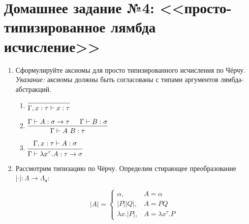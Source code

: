 

\cfoot{}



\section*{Домашнее задание №4: <<просто-типизированное лямбда исчисление>>}
\begin{enumerate}
      \item Сформулируйте аксиомы для просто типизированного исчисления по Чёрчу.
            \emph{Указание:} аксиомы должны быть согласованы с типами аргументов
            лямбда-абстракций.
            \begin{solution}\itemfix
                  \begin{enumerate}
                        \item \(\begin{prooftree}
                                    \infer0{\Gamma, x : \tau \vdash x : \tau}
                              \end{prooftree}\)
                        \item \(\begin{prooftree}
                                    \hypo{\Gamma \vdash A : \sigma \to \tau}
                                    \hypo{\Gamma \vdash B : \sigma}
                                    \infer2{\Gamma \vdash A\ B : \tau}
                              \end{prooftree}\)
                        \item \(\begin{prooftree}
                                    \hypo{\Gamma, x : \tau \vdash A : \sigma}
                                    \infer1{\Gamma \vdash \lambda x^\tau.A : \tau \to \sigma}
                              \end{prooftree}\)
                  \end{enumerate}
            \end{solution}
      \item Рассмотрим типизацию по Чёрчу. Определим стирающее преобразование $|\cdot|: \Lambda \rightarrow \Lambda_\textrm{ч}$:

            $$|A| = \left\{ \begin{array}{ll} \alpha,   & A = \alpha           \\
             |P| |Q|,       & A = P Q              \\
             \lambda x.|P|, & A = \lambda x^\tau.P\end{array}  \right.$$


\end{enumerate}
